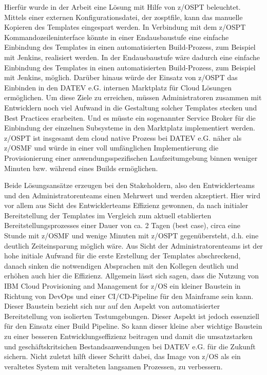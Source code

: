 Hierfür wurde in der Arbeit eine Lösung mit Hilfe von z/OSPT beleuchtet.
Mittels einer externen Konfigurationsdatei, der \glqq zosptfile\grqq, kann das manuelle Kopieren des Templates eingespart werden.
In Verbindung mit dem z/OSPT Kommandozeileninterface könnte in einer Endausbaustufe eine einfache Einbindung des Templates in einen automatisierten Build-Prozess, zum Beispiel mit Jenkins, realisiert werden.
In der Endausbaustufe wäre dadurch eine einfache Einbindung des Templates in einen automatisierten Build-Prozess, zum Beispiel mit Jenkins, möglich.
Darüber hinaus würde der Einsatz von z/OSPT das Einbinden in den DATEV e.G. internen \glqq Marktplatz\grqq{} für Cloud Lösungen ermöglichen.
Um diese Ziele zu erreichen, müssen Administratoren zusammen mit Entwicklern noch viel Aufwand in die Gestaltung solcher Templates stecken und Best Practices erarbeiten.
Und es müsste ein sogenannter \glqq Service Broker\grqq{} für die Einbindung der einzelnen Subsysteme in den \glqq Marktplatz\grqq{} implementiert werden.
z/OSPT ist insgesamt dem cloud native Prozess bei DATEV e.G. näher als z/OSMF und würde in einer voll umfänglichen Implementierung die Provisionierung einer anwendungsspezifischen Laufzeitumgebung binnen weniger Minuten bzw. während eines Builds ermöglichen.

Beide Lösungsansätze erzeugen bei den Stakeholdern, also den Entwicklerteams und den Administratorenteams einen Mehrwert und werden akzeptiert.
Hier wird vor allem aus Sicht des Entwicklerteams Effizienz gewonnen, da nach initialer Bereitstellung der Templates im Vergleich zum aktuell etablierten Bereitstellungsprozesses einer Dauer von ca. 2 Tagen (\glqq best case\grqq), circa eine Stunde mit z/OSMF und wenige Minuten mit z/OSPT gegenübersteht, d.h. eine deutlich Zeiteinsparung möglich wäre.
Aus Sicht der Administratorenteams ist der hohe initiale Aufwand für die erste Erstellung der Templates abschreckend, danach sinken die notwendigen Absprachen mit den Kollegen deutlich und erhöhen auch hier die Effizienz.
Allgemein lässt sich sagen, dass die Nutzung von \glqq IBM Cloud Provisioning and Management for z/OS\grqq{} ein kleiner Baustein in Richtung von DevOps und einer CI/CD-Pipeline für den Mainframe sein kann.
Dieser Baustein bezieht sich nur auf den Aspekt von automatisierter Bereitstellung von isolierten Testumgebungen.
Dieser Aspekt ist jedoch essenziell für den Einsatz einer Build Pipeline.
So kann dieser kleine aber wichtige Baustein zu einer besseren Entwicklungseffizienz beitragen und damit die umsatzstarken und geschäftskritsichen Bestandsanwendungen bei DATEV e.G. für die Zukunft sichern.
Nicht zuletzt hilft dieser Schritt dabei, das Image von z/OS als ein veraltetes System mit veralteten langsamen Prozessen, zu verbessern.

